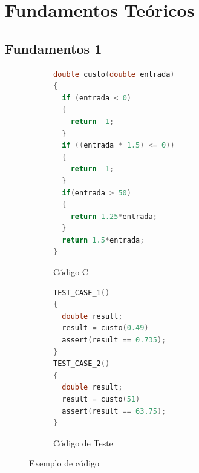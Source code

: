 \section{Fundamentos Teóricos}
\label{sec:fundamentos}




\subsection{Fundamentos 1}
\label{sec:fundamentos1}

\begin{figure}[thp]	
    \centering
    \begin{subfigure}{0.4\textwidth}
    \centering
    \begin{lstlisting}[language=C]       
double custo(double entrada)
{
  if (entrada < 0) 
  {
    return -1;
  }
  if ((entrada * 1.5) <= 0)) 
  {
    return -1;
  }
  if(entrada > 50) 
  {
    return 1.25*entrada;
  }
  return 1.5*entrada;
}
	\end{lstlisting}
    \caption{Código C}
  \end{subfigure}%
  \begin{subfigure}{.05\textwidth}
    \hfill
  \end{subfigure}%
  \begin{subfigure}{.4\textwidth}
    \centering
\begin{lstlisting}[language=C]   
TEST_CASE_1()
{
  double result;
  result = custo(0.49)
  assert(result == 0.735);
}
TEST_CASE_2()
{
  double result;
  result = custo(51)
  assert(result == 63.75);
}
\end{lstlisting}
  \caption{Código de Teste}
  \end{subfigure}%
  \caption{\label{fig:program_test} Exemplo de código}
\end{figure}


